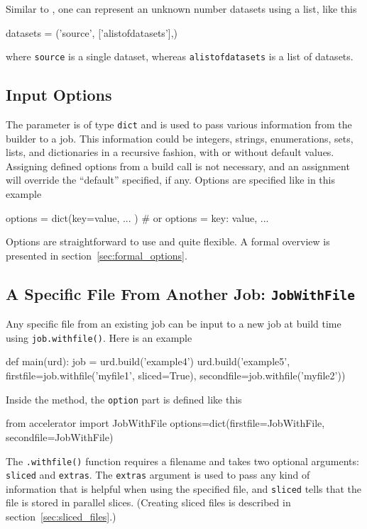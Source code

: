 Similar to \jobs, one can represent an unknown number datasets using a
list, like this
\begin{python}
datasets = ('source', ['alistofdatasets'],)
\end{python}
where \texttt{source} is a single dataset, whereas
\texttt{alistofdatasets} is a list of datasets.



\subsection{Input Options}

The \options parameter is of type \texttt{dict} and is used to pass
various information from the builder to a job.  This information could
be integers, strings, enumerations, sets, lists, and dictionaries in a
recursive fashion, with or without default values.  Assigning defined
options from a build call is not necessary, and an assignment will
override the ``default'' specified, if any.  Options are specified
like in this example
\begin{python}
  options = dict(key=value, ... )  # or
  options = {key: value, ...}
\end{python}

Options are straightforward to use and quite flexible.  A formal
overview is presented in section~\ref{sec:formal_options}.



\subsection{A Specific File From Another Job:  \texttt{JobWithFile}}
\label{sec:jobwithfile}
Any specific file from an existing job can be input to a new job at
build time using \texttt{job.withfile()}.  Here is an example
\begin{python}
def main(urd):
    job = urd.build('example4')
    urd.build('example5',
              firstfile=job.withfile('myfile1', sliced=True),
              secondfile=job.withfile('myfile2'))
\end{python}
Inside the method, the \texttt{option} part is defined like this
\begin{python}
from accelerator import JobWithFile
options=dict(firstfile=JobWithFile, secondfile=JobWithFile)
\end{python}
The \texttt{.withfile()} function requires a filename and takes two
optional arguments: \texttt{sliced} and \texttt{extras}.  The
\texttt{extras} argument is used to pass any kind of information that
is helpful when using the specified file, and \texttt{sliced} tells
that the file is stored in parallel slices.  (Creating sliced files is
described in section~\ref{sec:sliced_files}.)

